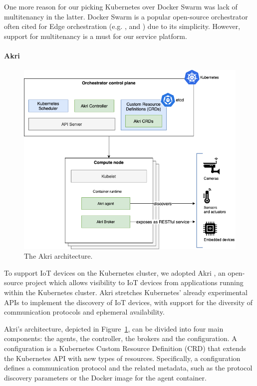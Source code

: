 One more reason for our picking Kubernetes over Docker Swarm \cite{docker-swarm} was lack of multitenancy in the latter. 
Docker Swarm is a popular open-source orchestrator often cited for Edge orchestration (e.g. \cite{bellavista2017feasibility}, and \cite{ismail2015evaluation}) due to its simplicity. However, support for multitenancy is a must for our service platform.

\paragraph{Akri}\label{p:akri}

\begin{figure}[ht]
\centering
\includegraphics[width=\columnwidth]{figures/akri}
\caption{The Akri architecture.}
\label{fig:akri}
\end{figure}

To support IoT devices on the Kubernetes cluster, we adopted Akri \cite{akri}, an open-source project which allows visibility to IoT devices from applications running within the Kubernetes cluster. Akri stretches Kubernetes' already experimental APIs to implement the discovery of IoT devices, with support for the diversity of communication protocols and ephemeral availability.

Akri's architecture, depicted in Figure~\ref{fig:akri}, can be divided into four main components: the agents, the controller, the brokers and the configuration. A configuration is a Kubernetes Custom Resource Definition (CRD) that extends the Kubernetes API with new types of resources. Specifically, a configuration defines a communication protocol and the related metadata, such as the protocol discovery parameters or the Docker image for the agent container.


